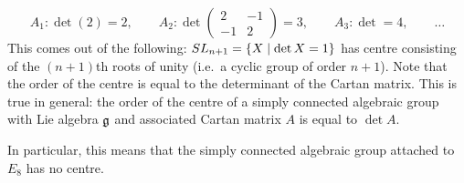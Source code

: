 \begin{example}
\[
  A_1\colon \det(2) = 2, \qquad
  A_2\colon \det \begin{pmatrix} 2 & -1 \\ -1 & 2 \end{pmatrix} = 3, \qquad
  A_3\colon \det = 4, \qquad \dots
\]
This comes out of the following: $SL_{n+1} = \{X \mid \det X = 1\}$ has centre
consisting of the $(n+1)$th roots of unity (i.e.\ a cyclic group of order
$n + 1$). Note that the order of the centre is equal to the determinant of the
Cartan matrix. This is true in general: the order of the centre of a simply
connected algebraic group with Lie algebra $\mathfrak{g}$ and associated Cartan matrix
$A$ is equal to $\det A$.

In particular, this means that the simply connected algebraic group attached
to $E_8$ has no centre.
\end{example}
